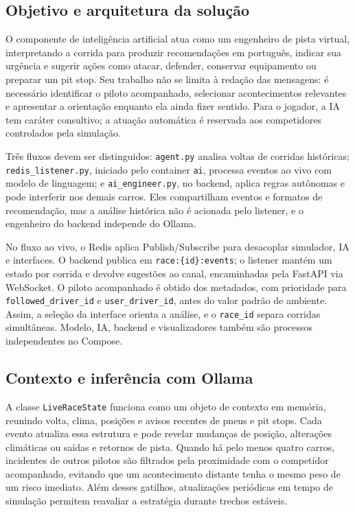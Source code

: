 \subsection{Objetivo e arquitetura da solução}

O componente de inteligência artificial atua como um engenheiro de pista virtual, interpretando a corrida para produzir recomendações em português, indicar sua urgência e sugerir ações como atacar, defender, conservar equipamento ou preparar um pit stop. Seu trabalho não se limita à redação das mensagens: é necessário identificar o piloto acompanhado, selecionar acontecimentos relevantes e apresentar a orientação enquanto ela ainda fizer sentido. Para o jogador, a IA tem caráter consultivo; a atuação automática é reservada aos competidores controlados pela simulação.

Três fluxos devem ser distinguidos: \texttt{agent.py} analisa voltas de corridas históricas; \texttt{redis\_listener.py}, iniciado pelo container \texttt{ai}, processa eventos ao vivo com modelo de linguagem; e \texttt{ai\_engineer.py}, no backend, aplica regras autônomas e pode interferir nos demais carros. Eles compartilham eventos e formatos de recomendação, mas a análise histórica não é acionada pelo listener, e o engenheiro do backend independe do Ollama.

No fluxo ao vivo, o Redis aplica Publish/Subscribe para desacoplar simulador, IA e interfaces. O backend publica em \texttt{race:\{id\}:events}; o listener mantém um estado por corrida e devolve sugestões ao canal, encaminhadas pela FastAPI via WebSocket. O piloto acompanhado é obtido dos metadados, com prioridade para \texttt{followed\_driver\_id} e \texttt{user\_driver\_id}, antes do valor padrão de ambiente. Assim, a seleção da interface orienta a análise, e o \texttt{race\_id} separa corridas simultâneas. Modelo, IA, backend e visualizadores também são processos independentes no Compose.

\subsection{Contexto e inferência com Ollama}

A classe \texttt{LiveRaceState} funciona como um objeto de contexto em memória, reunindo volta, clima, posições e avisos recentes de pneus e pit stops. Cada evento atualiza essa estrutura e pode revelar mudanças de posição, alterações climáticas ou saídas e retornos de pista. Quando há pelo menos quatro carros, incidentes de outros pilotos são filtrados pela proximidade com o competidor acompanhado, evitando que um acontecimento distante tenha o mesmo peso de um risco imediato. Além desses gatilhos, atualizações periódicas em tempo de simulação permitem reavaliar a estratégia durante trechos estáveis.

